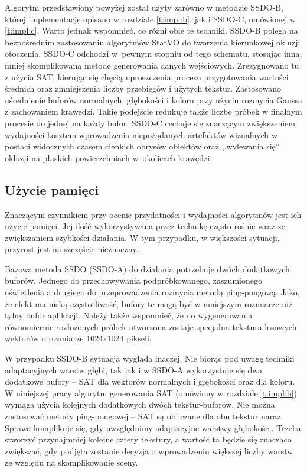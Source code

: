 		Algorytm przedstawiony powyżej został użyty zarówno w metodzie SSDO-B, której implementację opisano w rozdziale \ref{t:impl:b}, jak i SSDO-C, omówionej w \ref{t:impl:c}. Warto jednak wspomnieć, co różni obie te techniki. SSDO-B polega na bezpośrednim zastosowaniu algorytmów StatVO do tworzenia kierunkowej okluzji otoczenia. SSDO-C odchodzi w~pewnym stopniu od tego schematu, stosując inną, mniej skomplikowaną metodę generowania danych wejściowych. Zrezygnowano tu z użycia SAT, kierując się chęcią uproszczenia procesu przygotowania wartości średnich oraz zmniejszenia liczby przebiegów i użytych tekstur. Zastosowano uśrednienie buforów normalnych, głębokości i koloru przy użyciu rozmycia Gaussa z zachowaniem krawędzi. Takie podejście redukuje także liczbę próbek w finalnym procesie do jednej na każdy bufor. SSDO-C cechuje się znaczącym zwiększeniem wydajności kosztem wprowadzenia niepożądanych artefaktów wizualnych w postaci widocznych czasem cienkich obrysów obiektów oraz ,,wylewania się'' okluzji na płaskich powierzchniach w~okolicach krawędzi.
		
		\pagebreak
		
		\subsection{Użycie pamięci}
		\label{t:algorytm:stat:memory}
		
		Znaczącym czynnikiem przy ocenie przydatności i wydajności algorytmów jest ich użycie pamięci. Jej ilość wykorzystywana przez technikę często rośnie wraz ze zwiększaniem szybkości działania. W tym przypadku, w większości sytuacji, przyrost jest na szczęście nieznaczny. 
		
		Bazowa metoda SSDO (SSDO-A) do działania potrzebuje dwóch dodatkowych buforów. Jednego do przechowywania podpróbkowanego, zaszumionego oświetlenia a drugiego do przeprowadzenia rozmycia metodą ping-pongową. Jako, że efekt ma niską częstotliwość, bufory te mogą być w mniejszym rozmiarze niż tylny bufor aplikacji. Należy także wspomnieć, że do wygenerowania równomiernie rozłożonych próbek utworzona zostaje specjalna tekstura losowych wektorów o rozmiarze 1024x1024 pikseli. 
		
		W przypadku SSDO-B sytuacja wygląda inaczej. Nie biorąc pod uwagę techniki adaptacyjnych warstw głębi, tak jak i w SSDO-A wykorzystuje się dwa dodatkowe bufory -- SAT dla wektorów normalnych i głębokości oraz dla koloru. W niniejszej pracy algorytm generowania SAT (omówiony w rozdziale \ref{t:impl:b}) wymaga użycia kolejnych dodatkowych dwóch tekstur-buforów. Nie można zastosować metody ping-pongowej -- SAT są obliczane dla obu tekstur naraz. Sprawa komplikuje się, gdy uwzględnimy adaptacyjne warstwy głębokości. Trzeba stworzyć przynajmniej kolejne cztery tekstury, a wartość ta będzie się znacząco zwiększać, gdy podjęta zostanie decyzja o wprowadzeniu większej liczby warstw ze względu na skomplikowanie sceny.
		
